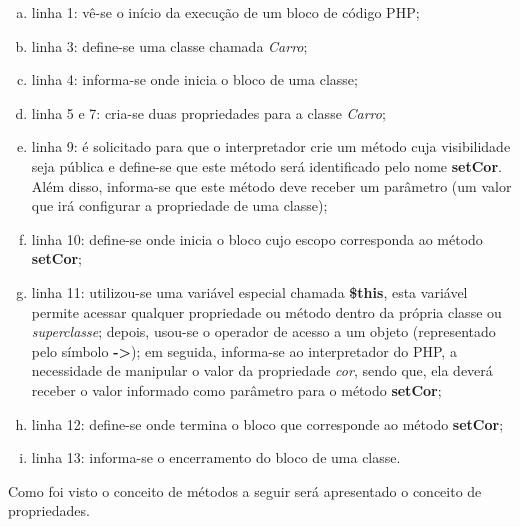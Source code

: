 \begin{enumerate}[a)]
    \item linha 1: vê-se o início da execução de um bloco de código PHP;
    \item linha 3: define-se uma classe chamada \textit{Carro};
    \item linha 4: informa-se onde inicia o bloco de uma classe;
    \item linha 5 e 7: cria-se duas propriedades para a classe
    \textit{Carro};
    \item linha 9: é solicitado para que o interpretador crie um método
    cuja visibilidade seja pública e define-se que este método será identificado
    pelo nome \textbf{setCor}.
    Além disso, informa-se que este método deve receber um parâmetro (um valor
    que  irá configurar a propriedade de uma classe);
    \item linha 10: define-se onde inicia o bloco cujo escopo
    corresponda ao método \textbf{setCor};
    \item linha 11: utilizou-se uma variável especial chamada
    \textbf{\$this}, esta variável permite acessar qualquer propriedade ou
    método dentro da própria classe ou \textit{superclasse}; depois, usou-se
    o operador de acesso a um objeto (representado pelo símbolo \textbf{->}); em
    seguida, informa-se ao interpretador do \acs{PHP}, a necessidade de
    manipular o valor da propriedade \textit{cor}, sendo que, ela deverá receber o valor
    informado como parâmetro para o método \textbf{setCor};
    \item linha 12: define-se onde termina o bloco que corresponde ao
    método \textbf{setCor};
    \item linha 13: informa-se o encerramento do bloco de uma classe.
\end{enumerate}

Como foi visto o conceito de métodos a seguir será apresentado o conceito de
propriedades.
